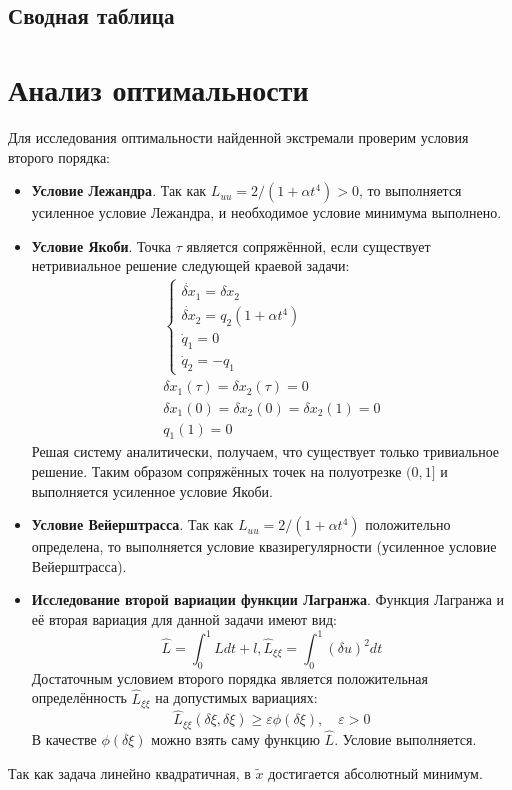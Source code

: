 \documentclass[a4paper,12pt]{article}
\begin{document}
\subsection*{Сводная таблица}


\section*{Анализ оптимальности}
Для исследования оптимальности найденной экстремали проверим условия второго порядка:
\begin{itemize}
  \item \textbf{Условие Лежандра}. Так как \(L_{uu}=2/\left(1+\alpha t^4\right) > 0\), то выполняется усиленное условие Лежандра, и необходимое условие минимума выполнено.
  \item \textbf{Условие Якоби}. Точка \(\tau\) является сопряжённой, если существует нетривиальное решение следующей краевой задачи:
  \begin{gather*}
    \begin{cases}
      \dot{\delta x}_1=\delta x_2\\
      \dot{\delta x}_2=q_2\left(1+\alpha t^4\right) \\
      \dot{q}_1=0\\
      \dot{q}_2=-q_1
    \end{cases}\\
    \delta x_1(\tau)=\delta x_2(\tau)=0\\
    \delta x_1(0) = \delta x_2(0) = \delta x_2(1) = 0\\
    q_1(1)=0
  \end{gather*}
  Решая систему аналитически, получаем, что существует только тривиальное решение. Таким образом сопряжённых точек на полуотрезке \((0,1]\) и выполняется усиленное условие Якоби.
  \item \textbf{Условие Вейерштрасса}. Так как \(L_{uu}=2/\left(1+\alpha t^4\right)\) положительно определена, то выполняется условие квазирегулярности (усиленное условие Вейерштрасса).
  \item \textbf{Исследование второй вариации функции Лагранжа}. Функция Лагранжа и её вторая вариация для данной задачи имеют вид:
  \begin{equation*}
    \hat{L}=\int_0^1L dt+l, \hat{L}_{\xi\xi}=\int_0^1(\delta u)^2 dt
  \end{equation*}
  Достаточным условием второго порядка является положительная определённость \(\hat{L}_{\xi\xi}\) на допустимых вариациях:
  \begin{equation*}
    \hat{L}_{\xi\xi}(\delta\xi,\delta\xi) \ge \varepsilon \phi(\delta\xi), \quad \varepsilon > 0
  \end{equation*}
  В качестве \(\phi(\delta\xi)\) можно взять саму функцию \(\hat{L}\). Условие выполняется.
\end{itemize}
Так как задача линейно квадратичная, в \(\tilde{x}\) достигается абсолютный минимум.
\end{document}
